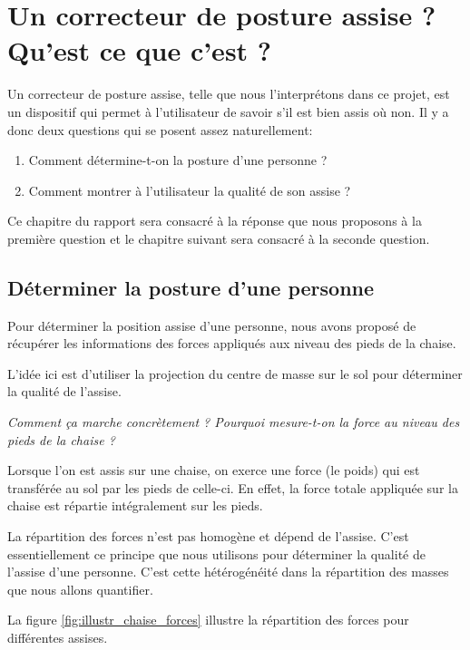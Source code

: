 \documentclass{polytech/polytech}
\begin{document}
\chapter{Un correcteur de posture assise ? Qu'est ce que c'est ?}
\label{chap:correcteur posture}

Un correcteur de posture assise, telle que nous l'interprétons dans ce projet, est un dispositif qui permet à l'utilisateur de savoir s'il est bien assis où non. Il y a donc deux questions qui se posent assez naturellement:

\begin{enumerate}
\item Comment détermine-t-on la posture d'une personne ?
\item Comment montrer à l'utilisateur la qualité de son assise ?
\end{enumerate}

Ce chapitre du rapport sera consacré à la réponse que nous proposons à la première question et le chapitre suivant sera consacré à la seconde question.

\section{Déterminer la posture d'une personne}
\label{chap:posture_determination}

Pour déterminer la position assise d'une personne, nous avons proposé de récupérer les informations des forces appliqués aux niveau des pieds de la chaise. 

L'idée ici est d'utiliser la projection du centre de masse sur le sol pour déterminer la qualité de l'assise. 

\begin{center}
\textit{Comment ça marche concrètement ? Pourquoi mesure-t-on la force au niveau des pieds de la chaise ?} 
\end{center}

Lorsque l'on est assis sur une chaise, on exerce une force (le poids) qui est transférée au sol par les pieds de celle-ci. En effet, la force totale appliquée sur la chaise est répartie intégralement sur les pieds.

La répartition des forces n'est pas homogène et dépend de l'assise. C'est essentiellement ce principe que nous utilisons pour déterminer la qualité de l'assise d'une personne. C'est cette hétérogénéité dans la répartition des masses que nous allons quantifier.

La figure \ref{fig:illustr_chaise_forces}  illustre la répartition des forces pour différentes assises.
\end{document}
